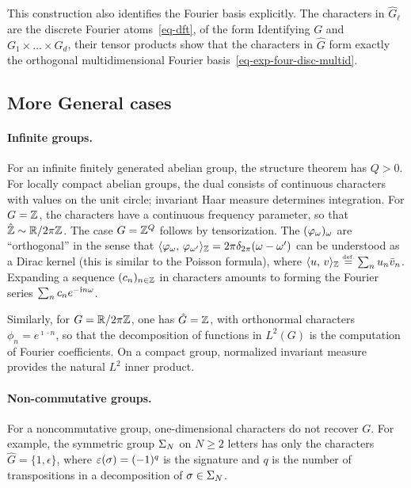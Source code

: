 This construction also identifies the Fourier basis explicitly. The characters in $\hat G_\ell$ are the discrete Fourier atoms~\eqref{eq-dft}, of the form
Identifying $G$ and $G_1 \times \ldots \times G_d$, 
their tensor products show that the characters in $\hat G$ form exactly the orthogonal multidimensional Fourier basis~\eqref{eq-exp-four-disc-multid}.

\subsection{More General cases}

\paragraph{Infinite groups.}

For an infinite finitely generated abelian group, the structure theorem has $Q>0$. For locally compact abelian groups, the dual consists of continuous characters with values on the unit circle; invariant Haar measure determines integration. For $G=\mathbb{Z}$, the characters have a continuous frequency parameter,
so that $\hat {\mathbb{Z}} \sim \mathbb{R}/2\pi\mathbb{Z}$.
%
The case $G=\mathbb{Z}^Q$ follows by tensorization. 
%
The $(\varphi_\omega)_\omega$ are ``orthogonal'' in the sense that $\langle \varphi_\omega,\,\varphi_{\omega'}\rangle_{\mathbb{Z}}=2\pi\delta_{2\pi}(\omega-\omega')$ can be understood as a Dirac kernel (this is similar to the Poisson formula), where $\langle u,\,v\rangle_{\mathbb{Z}} \stackrel{\mbox{\upshape\tiny def.}}{=} \sum_n u_n \bar v_n$.
%
Expanding a sequence $(c_n)_{n \in \mathbb{Z}}$ in characters amounts to forming the Fourier series $\sum_n c_n e^{-\mathrm{i} n \omega}$.

Similarly, for $G=\mathbb{R}/2\pi\mathbb{Z}$, one has $\hat G=\mathbb{Z}$, with orthonormal characters $\phi_n=e^{\imath \cdot n}$, so that the decomposition of functions in $L^2(G)$ is the computation of Fourier coefficients.
%
On a compact group, normalized invariant measure provides the natural $L^2$ inner product.

\paragraph{Non-commutative groups.}
 
For a noncommutative group, one-dimensional characters do not recover $G$. For example, the symmetric group $\Sigma_N$ on $N\geq2$ letters has only the characters $\hat G=\{1,\epsilon\}$, where $\varepsilon(\sigma) = (-1)^{q}$ is the signature and $q$ is the number of transpositions in a decomposition of $\sigma \in \Sigma_N$.

